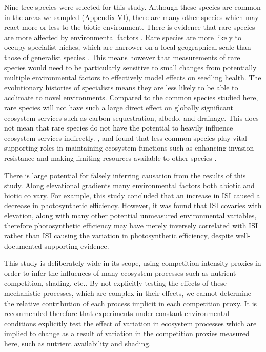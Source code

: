 \documentclass[a4paper, 11pt]{article}
\begin{document}
Nine tree species were selected for this study. Although these species are common in the areas we sampled (Appendix VI), there are many other species which may react more or less to the biotic environment. There is evidence that rare species are more affected by environmental factors \citep{Lyons2005,Mouillot2013}. Rare species are more likely to occupy specialist niches, which are narrower on a local geographical scale than those of generalist species \citep{Boulangeat2012}. This means however that measurements of rare species would need to be particularly sensitive to small changes from potentially multiple environmental factors to effectively model effects on seedling health. The evolutionary histories of specialists means they are less likely to be able to acclimate to novel environments. Compared to the common species studied here, rare species will not have such a large direct effect on globally significant ecosystem services such as carbon sequestration, albedo, and drainage. This does not mean that rare species do not have the potential to heavily influence ecosystem services indirectly. \citet{Lyons2001}, and \citet{Lyons2005} found that less common species play vital supporting roles in maintaining ecosystem functions such as enhancing invasion resistance and making limiting resources available to other species  . 

There is large potential for falsely inferring causation from the results of this study. Along elevational gradients many environmental factors both abiotic and biotic co
vary. For example, this study concluded that an increase in ISI caused a decrease in photosynthetic efficiency. However, it was found that ISI covaries with elevation, along with many other potential unmeasured environmental variables, therefore photosynthetic efficiency may have merely inversely correlated with ISI rather than ISI causing the variation in photosynthetic efficiency, despite well-documented supporting evidence.

This study is deliberately wide in its scope, using competition intensity proxies in order to infer the influences of many ecosystem processes such as nutrient competition, shading, etc.. By not explicitly testing the effects of these mechanistic processes, which are complex in their effects, we cannot determine the relative contribution of each process implicit in each competition proxy. It is recommended therefore that experiments under constant environmental conditions explicitly test the effect of variation in ecosystem processes which are implied to change as a result of variation in the competition proxies measured here, such as nutrient availability and shading.
\end{document}
